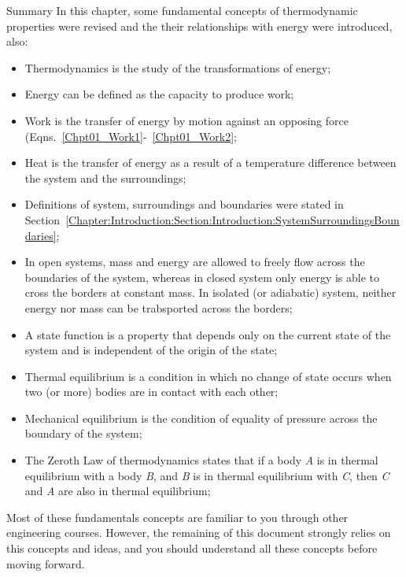 \clearpage   
\begin{FinalSummaryBlock}{Summary}
    In this chapter, some fundamental concepts of thermodynamic properties were revised and the their relationships with energy were introduced, also:
    \begin{itemize}
       \item Thermodynamics is the study of the transformations of energy;
       \item Energy can be defined as the capacity to produce work;
       \item Work is the transfer of energy by motion against an opposing force (Eqns.~\ref{Chpt01_Work1}-~\ref{Chpt01_Work2};
       \item Heat is the transfer of energy  as a result of a temperature difference between the system and the surroundings;
       \item Definitions of system, surroundings and boundaries were stated in Section~\ref{Chapter:Introduction:Section:Introduction:SystemSurroundingsBoundaries};
       \item In open systems, mass and energy are allowed to freely flow across the boundaries of the system, whereas in closed system only energy is able to cross the borders at constant mass. In isolated (or adiabatic) system, neither energy nor mass can be trabsported across the borders;
       \item A state function is a property that depends only on the current state of the system and is independent of the origin of the state; 
       \item Thermal equilibrium is a condition in which no change of state occurs when two (or more) bodies are in contact with each other;
       \item Mechanical equilibrium is the condition of equality of pressure across the boundary of the system;
       \item The Zeroth Law of thermodynamics states that if a body {\it A} is in thermal equilibrium with a body {\it B}, and {\it B} is in thermal equilibrium with {\it C}, then {\it C} and {\it A} are also in thermal equilibrium;
    \end{itemize} 
   
     Most of these fundamentals concepts are familiar to you through other engineering courses. However, the remaining of this document strongly relies on this concepts and ideas, and you should understand all these concepts before moving forward.
\end{FinalSummaryBlock}

